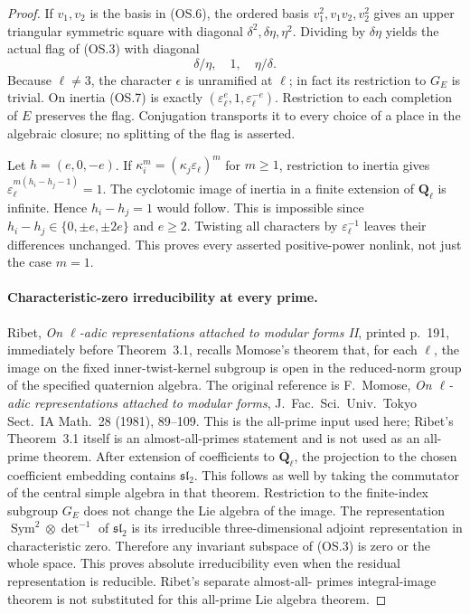 \begin{proof}
If $v_1,v_2$ is the basis in (OS.6), the ordered basis
$v_1^2,v_1v_2,v_2^2$ gives an upper triangular symmetric
square with diagonal $\delta^2,\delta\eta,\eta^2$.
Dividing by $\delta\eta$ yields the actual flag of (OS.3)
with diagonal
\[
                    \delta/\eta,\quad1,\quad\eta/\delta.
                                                               \tag{OS.7}
\]
Because $\ell\ne3$, the character $\epsilon$ is unramified
at $\ell$; in fact its restriction to $G_E$ is trivial.
On inertia (OS.7) is exactly
$(\varepsilon_\ell^e,1,\varepsilon_\ell^{-e})$.
Restriction to each completion of $E$ preserves the flag.
Conjugation transports it to every choice of a place in the
algebraic closure; no splitting of the flag is asserted.

Let $h=(e,0,-e)$. If
$\kappa_i^m=(\kappa_j\varepsilon_\ell)^m$ for $m\geq1$,
restriction to inertia gives
$\varepsilon_\ell^{m(h_i-h_j-1)}=1$.
The cyclotomic image of inertia in a finite extension of
$\mathbf Q_\ell$ is infinite. Hence $h_i-h_j=1$ would
follow. This is impossible since
$h_i-h_j\in\{0,\pm e,\pm2e\}$ and $e\geq2$.
Twisting all characters by $\varepsilon_\ell^{-1}$ leaves
their differences unchanged. This proves every asserted
positive-power nonlink, not just the case $m=1$.

\paragraph{Characteristic-zero irreducibility at every prime.}
Ribet, \emph{On $\ell$-adic representations attached to modular
forms II}, printed p.~191, immediately before Theorem~3.1,
recalls Momose's theorem that, for each $\ell$, the image
on the fixed inner-twist-kernel subgroup is open in the
reduced-norm group of the specified quaternion algebra.
The original reference is F.~Momose, \emph{On $\ell$-adic
representations attached to modular forms}, J.~Fac.~Sci.\
Univ.~Tokyo Sect.~IA Math.~28 (1981), 89--109.
This is the all-prime input used here; Ribet's Theorem~3.1
itself is an almost-all-primes statement and is not used
as an all-prime theorem.
After extension of coefficients to $\overline{\mathbf Q}_\ell$,
the projection to the chosen coefficient embedding contains
$\mathfrak{sl}_2$. This follows as well by taking the
commutator of the central simple algebra in that theorem.
Restriction to the finite-index subgroup $G_E$ does not
change the Lie algebra of the image. The representation
$\operatorname{Sym}^2\otimes\det^{-1}$ of
$\mathfrak{sl}_2$ is its irreducible three-dimensional
adjoint representation in characteristic zero. Therefore
any invariant subspace of (OS.3) is zero or the whole space.
This proves absolute irreducibility even when the residual
representation is reducible. Ribet's separate almost-all-
primes integral-image theorem is not substituted for this
all-prime Lie algebra theorem.


\end{proof}
